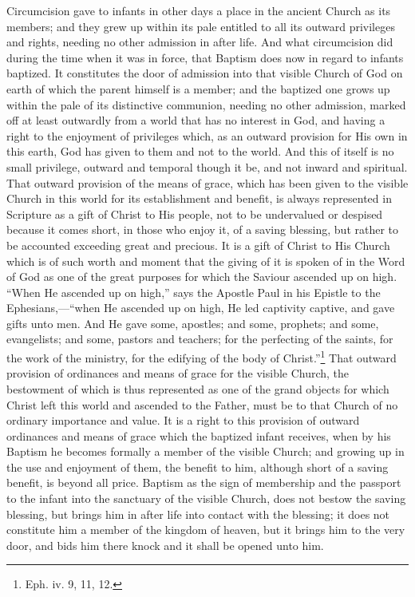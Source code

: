 \documentclass[]{book}
\begin{document}
Circumcision gave to infants in other days a place in the ancient Church as its members; and they grew up within its pale entitled to all its outward privileges and rights, needing no other admission in after life. And what circumcision did during the time when it was in force, that Baptism does now in regard to infants baptized. It constitutes the door of admission into that visible Church of God on earth of which the parent himself is a member; and the baptized one grows up within the pale of its distinctive communion, needing no other admission, marked off at least outwardly from a world that has no interest in God, and having a right to the enjoyment of privileges which, as an outward provision for His own in this earth, God has given to them and not to the world. And this of itself is no small privilege, outward and temporal though it be, and not inward and spiritual. That outward provision of the means of grace, which has been given to the visible Church in this world for its establishment and benefit, is always represented in Scripture as a gift of Christ to His people, not to be undervalued or despised because it comes short, in those who enjoy it, of a saving blessing, but rather to be accounted exceeding great and precious. It is a gift of Christ to His Church which is of such worth and moment that the giving of it is spoken of in the Word of God as one of the great purposes for which the Saviour ascended up on high. ``When He ascended up on high,'' says the Apostle Paul in his Epistle to the Ephesians,---``when He ascended up on high, He led captivity captive, and gave gifts unto men. And He gave some, apostles; and some, prophets; and some, evangelists; and some, pastors and teachers; for the perfecting of the saints, for the work of the ministry, for the edifying of the body of Christ.''\footnote{Eph. iv. 9, 11, 12.} That outward provision of ordinances and means of grace for the visible Church, the bestowment of which is thus represented as one of the grand objects for which Christ left this world and ascended to the Father, must be to that Church of no ordinary importance and value. It is a right to this provision of outward ordinances and means of grace which the baptized infant receives, when by his Baptism he becomes formally a member of the visible Church; and growing up in the use and enjoyment of them, the benefit to him, although short of a saving benefit, is beyond all price. Baptism as the sign of membership and the passport to the infant into the sanctuary of the visible Church, does not bestow the saving blessing, but brings him in after life into contact with the blessing; it does not constitute him a member of the kingdom of heaven, but it brings him to the very door, and bids him there knock and it shall be opened unto him.
\end{document}

